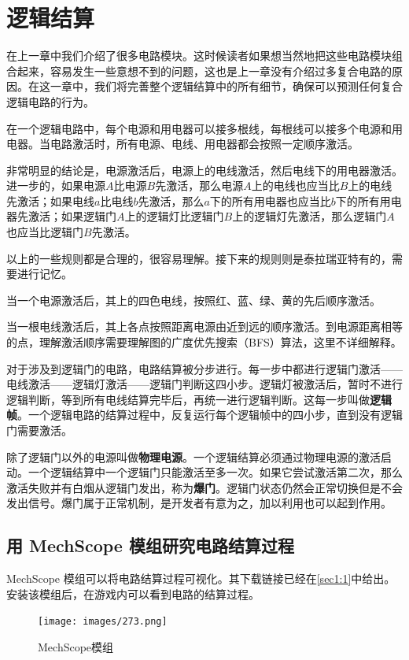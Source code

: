 \chapter{逻辑结算}\label{sec7}

在上一章中我们介绍了很多电路模块。这时候读者如果想当然地把这些电路模块组合起来，容易发生一些意想不到的问题，这也是上一章没有介绍过多复合电路的原因。在这一章中，我们将完善整个逻辑结算中的所有细节，确保可以预测任何复合逻辑电路的行为。

在一个逻辑电路中，每个电源和用电器可以接多根线，每根线可以接多个电源和用电器。当电路激活时，所有电源、电线、用电器都会按照一定顺序激活。

非常明显的结论是，电源激活后，电源上的电线激活，然后电线下的用电器激活。进一步的，如果电源$A$比电源$B$先激活，那么电源$A$上的电线也应当比$B$上的电线先激活；如果电线$a$比电线$b$先激活，那么$a$下的所有用电器也应当比$b$下的所有用电器先激活；如果逻辑门$A$上的逻辑灯比逻辑门$B$上的逻辑灯先激活，那么逻辑门$A$也应当比逻辑门$B$先激活。

以上的一些规则都是合理的，很容易理解。接下来的规则则是泰拉瑞亚特有的，需要进行记忆。

当一个电源激活后，其上的四色电线，按照红、蓝、绿、黄的先后顺序激活。

当一根电线激活后，其上各点按照距离电源由近到远的顺序激活。到电源距离相等的点，理解激活顺序需要理解图的广度优先搜索（BFS）算法，这里不详细解释。

对于涉及到逻辑门的电路，电路结算被分步进行。每一步中都进行逻辑门激活——电线激活——逻辑灯激活——逻辑门判断这四小步。逻辑灯被激活后，暂时不进行逻辑判断，等到所有电线结算完毕后，再统一进行逻辑判断。这每一步叫做\textbf{逻辑帧}。一个逻辑电路的结算过程中，反复运行每个逻辑帧中的四小步，直到没有逻辑门需要激活。

除了逻辑门以外的电源叫做\textbf{物理电源}。一个逻辑结算必须通过物理电源的激活启动。一个逻辑结算中一个逻辑门只能激活至多一次。如果它尝试激活第二次，那么激活失败并有白烟从逻辑门发出，称为\textbf{爆门}。逻辑门状态仍然会正常切换但是不会发出信号。爆门属于正常机制，是开发者有意为之，加以利用也可以起到作用。

\section{用 MechScope 模组研究电路结算过程}
MechScope 模组可以将电路结算过程可视化。其下载链接已经在\autoref{sec1:1}中给出。安装该模组后，在游戏内可以看到电路的结算过程。

\begin{figure}[!ht]
\texttt{[image: images/273.png]}
\caption{MechScope模组}\label{i273}
\end{figure}

